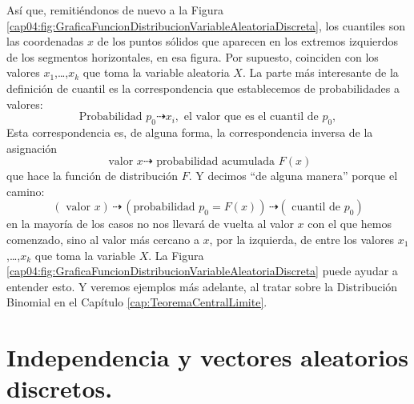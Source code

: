 %
Así que, remitiéndonos de nuevo a la Figura \ref{cap04:fig:GraficaFuncionDistribucionVariableAleatoriaDiscreta}, los cuantiles son las coordenadas $x$ de los puntos sólidos que aparecen en los extremos izquierdos de los segmentos horizontales, en esa figura. Por supuesto, coinciden con los valores $x_1$,\ldots,$x_k$ que toma la variable aleatoria $X$. La parte más interesante de la definición de cuantil es la correspondencia que establecemos de probabilidades a valores:
\[ \mbox{Probabilidad } p_0   \dashrightarrow x_i, \mbox{ el valor que es el cuantil de }p_0, \]
Esta correspondencia es, de alguna forma, la correspondencia inversa de la asignación
\[ \mbox{ valor }x \dashrightarrow \mbox{ probabilidad acumulada }F(x)\]
que hace la función de distribución $F$. Y decimos ``de alguna manera'' porque el camino:
\[
    (\mbox{ valor } x)\,\dashrightarrow\, (\mbox{probabilidad }p_0=F(x))\,\dashrightarrow (\mbox{ cuantil de }p_0)
\]
en la mayoría de los casos no nos llevará de vuelta al valor $x$  con el que hemos comenzado, sino al valor más cercano a $x$, por la izquierda, de entre los valores $x_1$,\ldots,$x_k$ que toma la variable $X$. La Figura \ref{cap04:fig:GraficaFuncionDistribucionVariableAleatoriaDiscreta} puede ayudar a entender esto. Y veremos ejemplos más adelante, al tratar sobre la Distribución Binomial en el Capítulo \ref{cap:TeoremaCentralLimite}.



\section{Independencia y vectores aleatorios discretos.}
\label{cap04:sec:IndependenciaVariablesAleatoriasDiscretas}
\\


